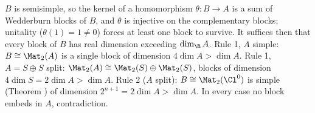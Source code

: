 $B$ is semisimple, so the kernel of a homomorphism $\theta : B \to A$ is a sum of Wedderburn blocks of $B$, and $\theta$ is injective on the complementary blocks; unitality ($\theta(1) = 1 \neq 0$) forces at least one block to survive. It suffices then that every block of $B$ has real dimension exceeding $\dim_\R A$. Rule 1, $A$ simple: $B \cong \Mat_2(A)$ is a single block of dimension $4 \dim A > \dim A$. Rule 1, $A = S \oplus S$ split: $\Mat_2(A) \cong \Mat_2(S) \oplus \Mat_2(S)$, blocks of dimension $4 \dim S = 2 \dim A > \dim A$. Rule 2 ($A$ split): $B \cong \Mat_2(\Cl^0)$ is simple (Theorem ) of dimension $2^{n+1} = 2\dim A > \dim A$. In every case no block embeds in $A$, contradiction.
